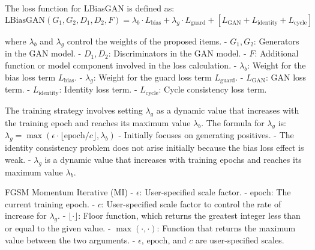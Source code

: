 The loss function for LBiasGAN is defined as:
$
\text{LBiasGAN}(G_1, G_2, D_1, D_2, F) = \lambda_b \cdot L_{\text{bias}} + \lambda_g \cdot L_{\text{guard}} + [L_{\text{GAN}} + L_{\text{identity}} + L_{\text{cycle}}]
$

where $\lambda_b$ and $\lambda_g$ control the weights of the proposed items.
- $G_1, G_2$: Generators in the GAN model.
- $D_1, D_2$: Discriminators in the GAN model.
- $F$: Additional function or model component involved in the loss calculation.
- $\lambda_b$: Weight for the bias loss term $L_{\text{bias}}$.
- $\lambda_g$: Weight for the guard loss term $L_{\text{guard}}$.
- $L_{\text{GAN}}$: GAN loss term.
- $L_{\text{identity}}$: Identity loss term.
- $L_{\text{cycle}}$: Cycle consistency loss term.

The training strategy involves setting $\lambda_g$ as a dynamic value that increases with the training epoch and reaches its maximum value $\lambda_b$. The formula for $\lambda_g$ is:
$
\lambda_g = \max(\epsilon \cdot \lfloor \text{epoch} / c \rfloor, \lambda_b)
$
- Initially focuses on generating positives.
- The identity consistency problem does not arise initially because the bias loss effect is weak.
- $\lambda_g$ is a dynamic value that increases with training epochs and reaches its maximum value $\lambda_b$.

FGSM Momentum Iterative (MI)
- $\epsilon$: User-specified scale factor.
- $\text{epoch}$: The current training epoch.
- $c$: User-specified scale factor to control the rate of increase for $\lambda_g$.
- $\lfloor \cdot \rfloor$: Floor function, which returns the greatest integer less than or equal to the given value.
- $\max(\cdot, \cdot)$: Function that returns the maximum value between the two arguments.
- $\epsilon$, $\text{epoch}$, and $c$ are user-specified scales.
